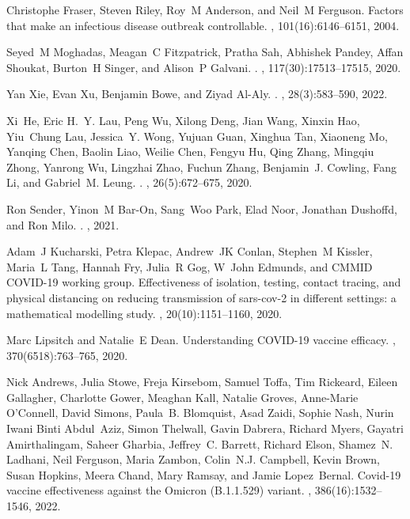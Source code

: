 \documentclass[12pt]{article}
\begin{document}
\begin{thebibliography}{10}
Christophe Fraser, Steven Riley, Roy~M Anderson, and Neil~M Ferguson.
\newblock Factors that make an infectious disease outbreak controllable.
,
  101(16):6146--6151, 2004.

Seyed~M Moghadas, Meagan~C Fitzpatrick, Pratha Sah, Abhishek Pandey, Affan
  Shoukat, Burton~H Singer, and Alison~P Galvani.
.
,
  117(30):17513--17515, 2020.

Yan Xie, Evan Xu, Benjamin Bowe, and Ziyad Al-Aly.
.
, 28(3):583--590, 2022.

Xi~He, Eric H.~Y. Lau, Peng Wu, Xilong Deng, Jian Wang, Xinxin Hao, Yiu~Chung
  Lau, Jessica~Y. Wong, Yujuan Guan, Xinghua Tan, Xiaoneng Mo, Yanqing Chen,
  Baolin Liao, Weilie Chen, Fengyu Hu, Qing Zhang, Mingqiu Zhong, Yanrong Wu,
  Lingzhai Zhao, Fuchun Zhang, Benjamin~J. Cowling, Fang Li, and Gabriel~M.
  Leung.
.
, 26(5):672--675, 2020.

Ron Sender, Yinon~M Bar-On, Sang~Woo Park, Elad Noor, Jonathan Dushoffd, and
  Ron Milo.
.
, 2021.

Adam~J Kucharski, Petra Klepac, Andrew~JK Conlan, Stephen~M Kissler, Maria~L
  Tang, Hannah Fry, Julia~R Gog, W~John Edmunds, and {CMMID COVID-19 working
  group}.
\newblock Effectiveness of isolation, testing, contact tracing, and physical
  distancing on reducing transmission of sars-cov-2 in different settings: a
  mathematical modelling study.
, 20(10):1151--1160, 2020.

Marc Lipsitch and Natalie~E Dean.
\newblock Understanding {COVID-19} vaccine efficacy.
, 370(6518):763--765, 2020.

Nick Andrews, Julia Stowe, Freja Kirsebom, Samuel Toffa, Tim Rickeard, Eileen
  Gallagher, Charlotte Gower, Meaghan Kall, Natalie Groves, Anne-Marie
  O’Connell, David Simons, Paula~B. Blomquist, Asad Zaidi, Sophie Nash, Nurin
  Iwani Binti Abdul~Aziz, Simon Thelwall, Gavin Dabrera, Richard Myers, Gayatri
  Amirthalingam, Saheer Gharbia, Jeffrey~C. Barrett, Richard Elson, Shamez~N.
  Ladhani, Neil Ferguson, Maria Zambon, Colin~N.J. Campbell, Kevin Brown, Susan
  Hopkins, Meera Chand, Mary Ramsay, and Jamie Lopez~Bernal.
\newblock Covid-19 vaccine effectiveness against the {Omicron (B.1.1.529)}
  variant.
, 386(16):1532--1546, 2022.


\end{thebibliography}
\end{document}
